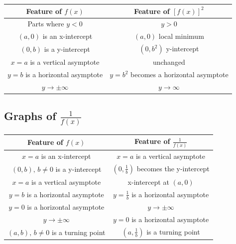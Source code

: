 \documentclass[11pt]{article}
\begin{document}
\begin{center}
  \def\arraystretch{2}%
  \begin{tabular}{c|c}
    Feature of $f(x)$               & Feature of $[f(x)]^2$                    \\ \hline
    Parts where $y < 0$             & $y > 0$                                  \\
    $(a, 0)$ is an x-intercept      & $(a, 0)$ local minimum                   \\
    $(0, b)$ is a y-intercept       & $(0, b^2)$ y-intercept                   \\
    $x=a$ is a vertical asymptote   & unchanged                                \\
    $y=b$ is a horizontal asymptote & $y = b^2$ becomes a horizontal asymptote \\
    $y\to \pm\infty$                & $y \to \infty$                           \\
  \end{tabular}
\end{center}


\subsection{Graphs of \texorpdfstring{$\frac{1}{f(x)}$}{the reciprocal of f(x)}}

\begin{center}
  \def\arraystretch{2}%
  \begin{tabular}{c|c}
    Feature of $f(x)$                      & Feature of $\frac{1}{f(x)}$                 \\ \hline
    $x=a$ is an x-intercept                & $x = a$ is a vertical asymptote             \\
    $(0, b),\, b\not=0$ is a y-intercept   & $(0, \frac{1}{b})$ becomes the y-intercept  \\
    $x=a$ is a vertical asymptote          & x-intercept at $(a, 0)$                     \\
    $y=b$ is a horizontal asymptote        & $y = \frac{1}{b}$ is a horizontal asymptote \\
    $y=0$ is a horizontal asymptote        & $y\to \pm \infty$                           \\
    $y\to \pm\infty$                       & $y = 0$ is a horizontal asymptote           \\
    $(a, b),\, b\not=0$ is a turning point & $(a, \frac{1}{b})$ is a turning point       \\
  \end{tabular}
\end{center}
\end{document}
